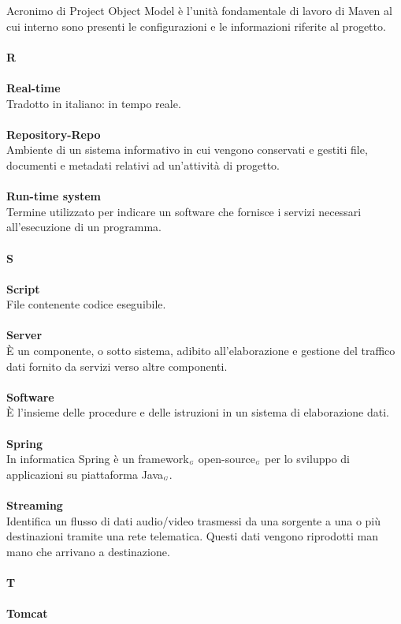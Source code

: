 Acronimo di Project Object Model è l'unità fondamentale di lavoro di Maven al cui interno sono presenti le configurazioni e le informazioni riferite al progetto.\\
\\
\textbf{R}\\
\\
\textbf{Real-time}\\
Tradotto in italiano: in tempo reale.\\
\\
\textbf{Repository-Repo}\\
Ambiente di un sistema informativo in cui vengono conservati e gestiti file, documenti e metadati relativi ad un’attività di progetto.\\
\\
\textbf{Run-time system}\\
Termine utilizzato per indicare un software che fornisce i servizi necessari all'esecuzione di un programma.\\
\\
\textbf{S}\\
\\
\textbf{Script}\\
File contenente codice eseguibile.\\
\\
\textbf{Server}\\
È un componente, o sotto sistema, adibito all'elaborazione e gestione del traffico dati fornito da servizi verso altre componenti.\\
\\
\textbf{Software}\\
È l'insieme delle procedure e delle istruzioni in un sistema di elaborazione dati.\\
\\
\textbf{Spring}\\
In informatica Spring è un framework$_{\scaleto{G}{3pt}}$ open-source$_{\scaleto{G}{3pt}}$ per lo sviluppo di applicazioni su piattaforma Java$_{\scaleto{G}{3pt}}$.\\
\\
\textbf{Streaming}\\
Identifica un flusso di dati audio/video trasmessi da una sorgente a una o più destinazioni tramite una rete telematica. Questi dati vengono riprodotti man mano che arrivano a destinazione.\\
\\
\textbf{T}\\
\\
\textbf{Tomcat}\\
